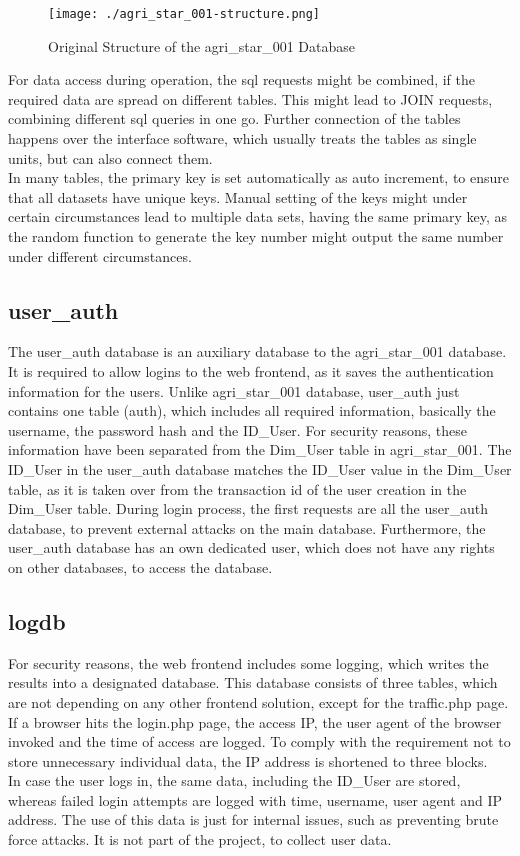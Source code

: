 \begin{figure}[h!]
 \centering
 \texttt{[image: ./agri\_star\_001-structure.png]}
 \caption{Original Structure of the agri\_star\_001 Database}
\end{figure}

\noindent For data access during operation, the sql requests might be combined, if the required data are spread on different tables. This might lead to JOIN requests, combining 
different sql queries in one go. Further connection of the tables happens over the interface software, which usually treats the tables as single units, but can also connect them.\\
In many tables, the primary key is set automatically as auto increment, to ensure that all datasets have unique keys. Manual setting of the keys might under certain circumstances 
lead to multiple data sets, having the same primary key, as the random function to generate the key number might output the same number under different circumstances.

\subsection{user\_auth}

The user\_auth database is an auxiliary database to the agri\_star\_001 database. It is required to allow logins to the web frontend, as it saves the authentication information 
for the users. Unlike agri\_star\_001 database, user\_auth just contains one table (auth), which includes all required information, basically the username, the password hash and the 
ID\_User. For security reasons, these information have been separated from the Dim\_User table in agri\_star\_001. The ID\_User in the user\_auth database matches the ID\_User 
value in the Dim\_User table, as it is taken over from the transaction id of the user creation in the Dim\_User table. During login process, the first requests are all the 
user\_auth database, to prevent external attacks on the main database. Furthermore, the user\_auth database has an own dedicated user, which does not have any rights on other 
databases, to access the database.

\subsection{logdb}
For security reasons, the web frontend includes some logging, which writes the results into a designated database. This database consists of three tables, which are not depending 
on any other frontend solution, except for the traffic.php page. If a browser hits the login.php page, the access IP, the user agent of the browser invoked and the time of access 
are logged. To comply with the requirement not to store unnecessary individual data, the IP address is shortened to three blocks.\\
In case the user logs in, the same data, including the ID\_User are stored, whereas failed login attempts are logged with time, username, user agent and IP address. The use of 
this data is just for internal issues, such as preventing brute force attacks. It is not part of the project, to collect user data.
